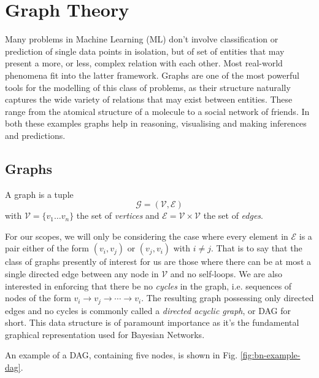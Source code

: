 \section{Graph Theory} \label{sec:graph-theory}
Many problems in Machine Learning (ML) don't involve classification or prediction of single data points in isolation, but of set of entities that may present a more, or less, complex relation with each other. 
Most real-world phenomena fit into the latter framework.
Graphs are one of the most powerful tools for the modelling of this class of problems, as their structure naturally captures the wide variety of relations that may exist between entities.
These range from the atomical structure of a molecule to a social network of friends.  
In both these examples graphs help in reasoning, visualising and making inferences and predictions.

\subsection{Graphs} \label{subsec:graphs}
\begin{definition}
	A graph is a tuple 
	\begin{equation}
	\mathcal{G} = (\mathcal{V}, \mathcal{E})
\end{equation}
with $\mathcal{V} = \{ v_1 \ldots v_n \}$ the set of \textit{vertices} and $\mathcal{E} = \mathcal{V} \times \mathcal{V}$ the set of \textit{edges}.
\end{definition}

For our scopes, we will only be considering the case where every element in $\mathcal{E}$ is a pair either of the form $(v_i, v_j)$ or $(v_j, v_i)$ with $i \neq j$.  
That is to say that the class of graphs presently of interest for us are those where there can be at most a single directed edge between any node in $\mathcal{V}$ and no self-loops.
We are also interested in enforcing that there be no \textit{cycles} in the graph, i.e. sequences of nodes of the form $v_i \rightarrow v_j \rightarrow \cdots \rightarrow v_i$.
The resulting graph possessing only directed edges and no cycles is commonly called a \textit{directed acyclic graph}, or DAG for short.  
This data structure is of paramount importance as it's the fundamental graphical representation used for Bayesian Networks.

An example of a DAG, containing five nodes, is shown in Fig. \ref{fig:bn-example-dag}.


